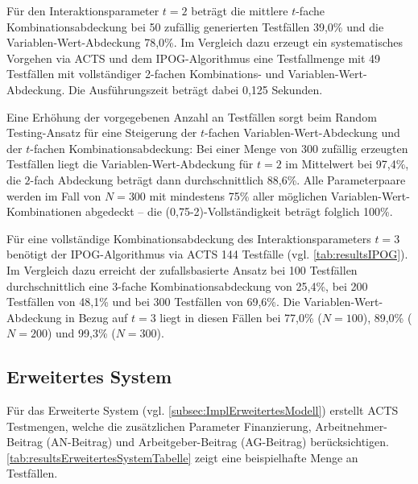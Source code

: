 Für den Interaktionsparameter $t=2$ beträgt die mittlere $t$-fache Kombinationsabdeckung bei 50 zufällig generierten Testfällen 39,0\% und die Variablen-Wert-Abdeckung 78,0\%. Im Vergleich dazu erzeugt ein systematisches Vorgehen via ACTS und dem IPOG-Algorithmus eine Testfallmenge mit 49 Testfällen mit vollständiger 2-fachen Kombinations- und Variablen-Wert-Abdeckung. Die Ausführungszeit beträgt dabei 0,125 Sekunden.

Eine Erhöhung der vorgegebenen Anzahl an Testfällen sorgt beim Random Testing-Ansatz für eine Steigerung der $t$-fachen Variablen-Wert-Abdeckung und der $t$-fachen Kombinationsabdeckung: Bei einer Menge von 300 zufällig erzeugten Testfällen liegt die Variablen-Wert-Abdeckung für $t=2$ im Mittelwert bei 97,4\%, die $2$-fach Abdeckung beträgt dann durchschnittlich 88,6\%. Alle Parameterpaare werden im Fall von $N=300$ mit mindestens 75\% aller möglichen Variablen-Wert-Kombinationen abgedeckt -- die (0,75-2)-Vollständigkeit beträgt folglich 100\%.

Für eine vollständige Kombinationsabdeckung des Interaktionsparameters $t=3$ benötigt der IPOG-Algorithmus via ACTS 144 Testfälle (vgl. \autoref{tab:resultsIPOG}). Im Vergleich dazu erreicht der zufallsbasierte Ansatz bei 100 Testfällen durchschnittlich eine 3-fache Kombinationsabdeckung von 25,4\%, bei 200 Testfällen von 48,1\% und bei 300 Testfällen von 69,6\%. Die Variablen-Wert-Abdeckung in Bezug auf $t=3$ liegt in diesen Fällen bei 77,0\% ($N=100$), 89,0\% ($N=200$) und 99,3\% ($N=300$).

\subsection{Erweitertes System}\label{subsec:resultsComplexSystem}

Für das Erweiterte System (vgl. \autoref{subsec:ImplErweitertesModell}) erstellt ACTS Testmengen, welche die zusätzlichen Parameter Finanzierung, Arbeitnehmer-Beitrag (AN-Beitrag) und Arbeitgeber-Beitrag (AG-Beitrag) berücksichtigen. \autoref{tab:resultsErweitertesSystemTabelle} zeigt eine beispielhafte Menge an Testfällen.

